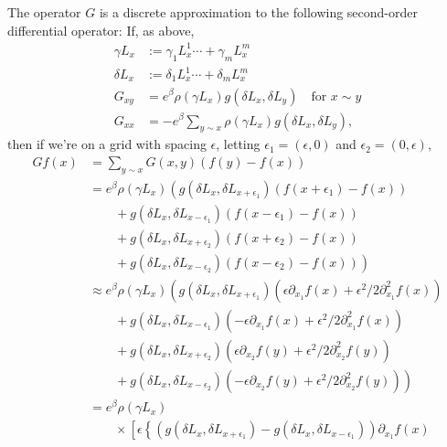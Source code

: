 \documentclass{article}
\begin{document}
The operator $G$ is a discrete approximation to the following second-order differential operator:
If, as above,
\begin{align}
  \gamma L_x &:= \gamma_1 L^1_x \cdots + \gamma_m L^m_x  \\
  \delta L_x &:= \delta_1 L^1_x \cdots + \delta_m L^m_x  \\
  G_{xy} &= e^\beta \rho( \gamma L_x ) g( \delta L_x, \delta L_y ) \quad \text{for $x \sim y$} \\
  G_{xx} &= - e^\beta \sum_{y \sim x} \rho( \gamma L_x ) g( \delta L_x, \delta L_y ) ,
\end{align}
then if we're on a grid with spacing $\epsilon$,
letting $\epsilon_1 = (\epsilon,0)$ and $\epsilon_2 = (0,\epsilon)$,
\begin{align}
  Gf(x) &= \sum_{y \sim x} G(x,y) (f(y)-f(x)) \\
  &= 
    e^\beta \rho(\gamma L_{x}) 
    \left( 
      g(\delta L_x,\delta L_{x+\epsilon_1}) (f(x+\epsilon_1)-f(x))
      \right. \\ &\qquad \left. {}
      + g(\delta L_x,\delta L_{x-\epsilon_1}) (f(x-\epsilon_1)-f(x))
      \right. \\ &\qquad \left. {}
      + g(\delta L_x,\delta L_{x+\epsilon_2}) (f(x+\epsilon_2)-f(x))
      \right. \\ &\qquad \left. {}
      + g(\delta L_x,\delta L_{x-\epsilon_2}) (f(x-\epsilon_2)-f(x))
    \right) \\
  &\approx
    e^\beta \rho(\gamma L_{x}) 
    \left( 
      g(\delta L_x,\delta L_{x+\epsilon_1}) (\epsilon \partial_{x_1} f(x) + \epsilon^2/2 \partial_{x_1}^2 f(x))
      \right. \\ &\qquad \left. {}
      + g(\delta L_x,\delta L_{x-\epsilon_1}) (- \epsilon \partial_{x_1} f(x) + \epsilon^2/2 \partial_{x_1}^2 f(x)) 
      \right. \\ &\qquad \left. {}
      + g(\delta L_x,\delta L_{x+\epsilon_2}) (\epsilon \partial_{x_2} f(y) + \epsilon^2/2 \partial_{x_2}^2 f(y))
      \right. \\ &\qquad \left. {}
      + g(\delta L_x,\delta L_{x-\epsilon_2}) (-\epsilon \partial_{x_2} f(y) + \epsilon^2/2 \partial_{x_2}^2 f(y))
    \right) \\
  &=
    e^\beta \rho(\gamma L_{x})  \\
    &\qquad {} \times \left[
    \epsilon \left\{ 
        \left(
          g(\delta L_x,\delta L_{x+\epsilon_1}) - g(\delta L_x,\delta L_{x-\epsilon_1}) 
        \right) \partial_{x_1} f(x) 
      \right. \right. \\ &\qquad \qquad \left. \left. {}

\end{align}
\end{document}

